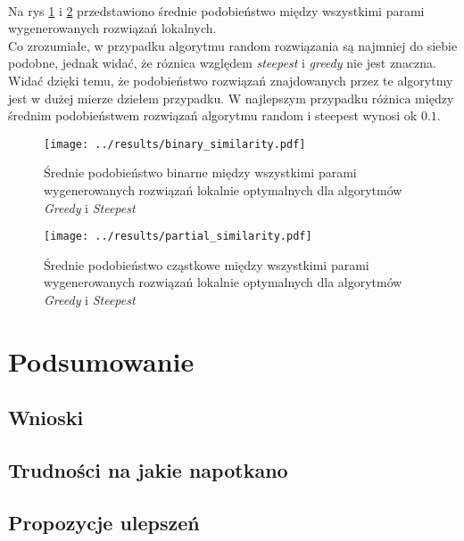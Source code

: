 \documentclass{article}
\begin{document}
	\\Na rys \ref{fig:bin_sim} i \ref{fig:part_sim} przedstawiono średnie podobieństwo między wszystkimi parami wygenerowanych rozwiązań lokalnych. 
	\\Co zrozumiałe, w przypadku algorytmu random rozwiązania są najmniej do siebie podobne, jednak widać, że róznica względem \emph{steepest} i \emph{greedy} nie jest znaczna. Widać dzięki temu, że podobieństwo rozwiązań znajdowanych przez te algorytmy jest w dużej mierze dziełem przypadku. W najlepszym przypadku różnica między średnim podobieństwem rozwiązań algorytmu random i steepest wynosi ok $0.1$.
			\begin{figure}[h]
				\texttt{[image: ../results/binary\_similarity.pdf]}
				\caption{Średnie podobieństwo binarne między wszystkimi parami wygenerowanych rozwiązań lokalnie optymalnych dla algorytmów \emph{Greedy} i \emph{Steepest}\label{fig:bin_sim}}		
			\end{figure}				
			\begin{figure}[h]
				\texttt{[image: ../results/partial\_similarity.pdf]}
				\caption{Średnie podobieństwo cząstkowe między wszystkimi parami wygenerowanych rozwiązań lokalnie optymalnych dla algorytmów \emph{Greedy} i \emph{Steepest}\label{fig:part_sim}}		
			\end{figure}	
		
\section{Podsumowanie}
	\subsection{Wnioski}
	\subsection{Trudności na jakie napotkano}
	\subsection{Propozycje ulepszeń}




\end{document}
